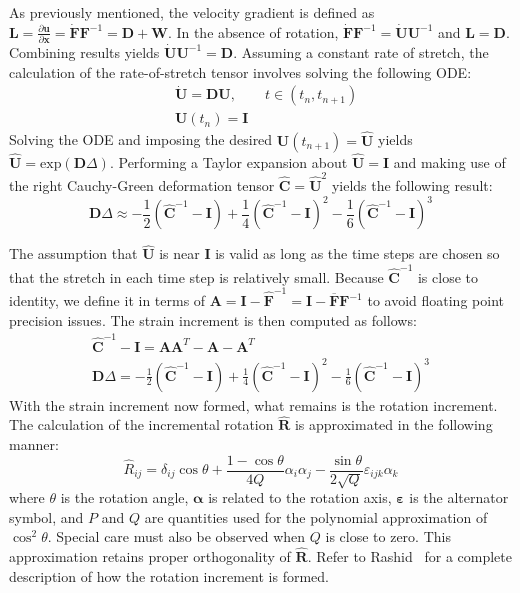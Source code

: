 As previously mentioned, the velocity gradient is defined as $\bm{L} = \frac{\partial \bm{u}}{\partial \bm{x}} = \dot{\bm{F}}\bm{F}^{-1} = \bm{D} + \bm{W}$. In the absence of rotation, $\dot{\bm{F}}\bm{F}^{-1} = \dot{\bm{U}}\bm{U}^{-1}$ and $\bm{L} = \bm{D}$. Combining results yields $\dot{\bm{U}}\bm{U}^{-1} = \bm{D}$. Assuming a constant rate of stretch, the calculation of the rate-of-stretch tensor involves solving the following ODE:
\begin{align}
&\dot{{\bm{U}}} = {\bm{D}}{\bm{U}}, \qquad t\in (t_n, t_{n+1}) \\
&{\bm{U}}\left(t_n\right) = \bm{I}
\end{align}
Solving the ODE and imposing the desired ${\bm{U}}(t_{n+1}) = \hat{\bm{U}}$ yields $\hat{\bm{U}} = \text{exp}(\bm{D}\Delta)$. Performing a Taylor expansion about $\hat{\bm{U}} = \bm{I}$ and making use of the right Cauchy-Green deformation tensor $\hat{\bm{C}} = \hat{\bm{U}}^2$ yields the following result: 
\begin{equation}
{\bm{D}}\Delta \approx -\frac{1}{2}(\hat{\bm C}^{-1} - {\bm{I}})+ \frac{1}{4} (\hat{\bm{C}}^{-1} - {\bm{I}})^{2} - \frac{1}{6} (\hat{\bm{C}}^{-1} - {\bm{I}})^{3}
\end{equation}

The assumption that $\hat{\bm{U}}$ is near $\bm{I}$ is valid as long as the time steps are chosen so that the stretch in each time step is relatively small. Because $\hat{\bm{C}}^{-1}$ is close to identity, we define it in terms of $\bm{A} = \bm{I} - \hat{\bm{F}}^{-1} = \bm{I} - \bm{\overline{F}}\bm{F}^{-1}$ to avoid floating point precision issues. The strain increment is then computed as follows:
\begin{gather}
\hat{\bm C}^{-1} - {\bm I} = \bm{A} \bm{A}^T - \bm{A} - \bm{A}^T \\
{\bm D}\Delta = -\frac{1}{2}(\hat{\bm C}^{-1} - {\bm I})+ \frac{1}{4} (\hat{\bm C}^{-1} - {\bm I})^{2} - \frac{1}{6} (\hat{\bm C}^{-1} - {\bm I})^{3}
\end{gather}
With the strain increment now formed, what remains is the rotation increment. The calculation of the incremental rotation $\hat{\bm{R}}$ is approximated in the following manner:
\begin{equation}
\hat{R}_{ij} = \delta_{ij}\cos\theta + \frac{1 - \cos \theta}{4Q}\alpha_i\alpha_j - \frac{\sin\theta}{2\sqrt{Q}}\varepsilon_{ijk}\alpha_{k}
\end{equation}
where $\theta$ is the rotation angle, $\boldsymbol{\alpha}$ is related to the rotation axis, $\boldsymbol{\varepsilon}$ is the alternator symbol, and $P$ and $Q$ are quantities used for the polynomial approximation of $\cos^2\theta$. Special care must also be observed when $Q$ is close to zero. This approximation retains proper orthogonality of $\hat{\bm{R}}$. Refer to Rashid~\cite{rashid_1993} for a complete description of how the rotation increment is formed.

